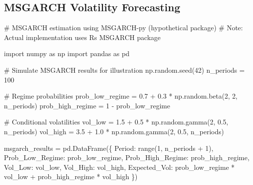 \documentclass[
  10pt,
  a4paper,
]{article}
\newenvironment{Shaded}{\begin{snugshade}}{\end{snugshade}}
\newcommand{\BuiltInTok}[1]{\textcolor[rgb]{0.00,0.23,0.31}{#1}}
\newcommand{\CommentTok}[1]{\textcolor[rgb]{0.37,0.37,0.37}{#1}}
\newcommand{\DecValTok}[1]{\textcolor[rgb]{0.68,0.00,0.00}{#1}}
\newcommand{\FloatTok}[1]{\textcolor[rgb]{0.68,0.00,0.00}{#1}}
\newcommand{\ImportTok}[1]{\textcolor[rgb]{0.00,0.46,0.62}{#1}}
\newcommand{\NormalTok}[1]{\textcolor[rgb]{0.00,0.23,0.31}{#1}}
\newcommand{\OperatorTok}[1]{\textcolor[rgb]{0.37,0.37,0.37}{#1}}
\newcommand{\StringTok}[1]{\textcolor[rgb]{0.13,0.47,0.30}{#1}}
\begin{document}
\begin{tcolorbox}
\subsection{MSGARCH Volatility
Forecasting}\label{msgarch-volatility-forecasting}

\begin{Shaded}
\begin{Highlighting}[]
\CommentTok{\# MSGARCH estimation using MSGARCH{-}py (hypothetical package)}
\CommentTok{\# Note: Actual implementation uses R\textquotesingle{}s MSGARCH package}

\ImportTok{import}\NormalTok{ numpy }\ImportTok{as}\NormalTok{ np}
\ImportTok{import}\NormalTok{ pandas }\ImportTok{as}\NormalTok{ pd}

\CommentTok{\# Simulate MSGARCH results for illustration}
\NormalTok{np.random.seed(}\DecValTok{42}\NormalTok{)}
\NormalTok{n\_periods }\OperatorTok{=} \DecValTok{100}

\CommentTok{\# Regime probabilities}
\NormalTok{prob\_low\_regime }\OperatorTok{=} \FloatTok{0.7} \OperatorTok{+} \FloatTok{0.3} \OperatorTok{*}\NormalTok{ np.random.beta(}\DecValTok{2}\NormalTok{, }\DecValTok{2}\NormalTok{, n\_periods)}
\NormalTok{prob\_high\_regime }\OperatorTok{=} \DecValTok{1} \OperatorTok{{-}}\NormalTok{ prob\_low\_regime}

\CommentTok{\# Conditional volatilities}
\NormalTok{vol\_low }\OperatorTok{=} \FloatTok{1.5} \OperatorTok{+} \FloatTok{0.5} \OperatorTok{*}\NormalTok{ np.random.gamma(}\DecValTok{2}\NormalTok{, }\FloatTok{0.5}\NormalTok{, n\_periods)}
\NormalTok{vol\_high }\OperatorTok{=} \FloatTok{3.5} \OperatorTok{+} \FloatTok{1.0} \OperatorTok{*}\NormalTok{ np.random.gamma(}\DecValTok{2}\NormalTok{, }\FloatTok{0.5}\NormalTok{, n\_periods)}

\NormalTok{msgarch\_results }\OperatorTok{=}\NormalTok{ pd.DataFrame(\{}
    \StringTok{\textquotesingle{}Period\textquotesingle{}}\NormalTok{: }\BuiltInTok{range}\NormalTok{(}\DecValTok{1}\NormalTok{, n\_periods }\OperatorTok{+} \DecValTok{1}\NormalTok{),}
    \StringTok{\textquotesingle{}Prob\_Low\_Regime\textquotesingle{}}\NormalTok{: prob\_low\_regime,}
    \StringTok{\textquotesingle{}Prob\_High\_Regime\textquotesingle{}}\NormalTok{: prob\_high\_regime,}
    \StringTok{\textquotesingle{}Vol\_Low\textquotesingle{}}\NormalTok{: vol\_low,}
    \StringTok{\textquotesingle{}Vol\_High\textquotesingle{}}\NormalTok{: vol\_high,}
    \StringTok{\textquotesingle{}Expected\_Vol\textquotesingle{}}\NormalTok{: prob\_low\_regime }\OperatorTok{*}\NormalTok{ vol\_low }\OperatorTok{+}\NormalTok{ prob\_high\_regime }\OperatorTok{*}\NormalTok{ vol\_high}
\NormalTok{\})}


\end{Highlighting}
\end{Shaded}
\end{tcolorbox}
\end{document}
